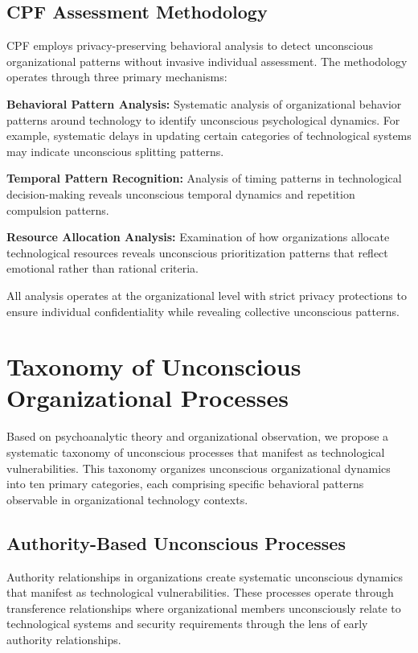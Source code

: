 \documentclass[10pt, twocolumn]{article}
\begin{document}
\subsection{CPF Assessment Methodology}

CPF employs privacy-preserving behavioral analysis to detect unconscious organizational patterns without invasive individual assessment. The methodology operates through three primary mechanisms:

\textbf{Behavioral Pattern Analysis:} Systematic analysis of organizational behavior patterns around technology to identify unconscious psychological dynamics. For example, systematic delays in updating certain categories of technological systems may indicate unconscious splitting patterns.

\textbf{Temporal Pattern Recognition:} Analysis of timing patterns in technological decision-making reveals unconscious temporal dynamics and repetition compulsion patterns.

\textbf{Resource Allocation Analysis:} Examination of how organizations allocate technological resources reveals unconscious prioritization patterns that reflect emotional rather than rational criteria.

All analysis operates at the organizational level with strict privacy protections to ensure individual confidentiality while revealing collective unconscious patterns.

\section{Taxonomy of Unconscious Organizational Processes}

Based on psychoanalytic theory and organizational observation, we propose a systematic taxonomy of unconscious processes that manifest as technological vulnerabilities. This taxonomy organizes unconscious organizational dynamics into ten primary categories, each comprising specific behavioral patterns observable in organizational technology contexts.

\subsection{Authority-Based Unconscious Processes}

Authority relationships in organizations create systematic unconscious dynamics that manifest as technological vulnerabilities. These processes operate through transference relationships where organizational members unconsciously relate to technological systems and security requirements through the lens of early authority relationships.
\end{document}
